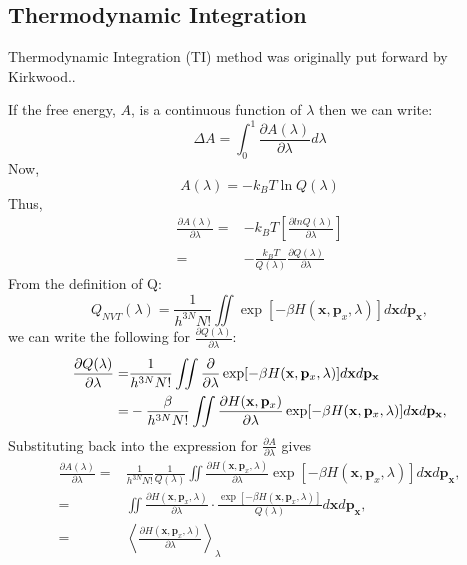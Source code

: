 \subsection{Thermodynamic Integration\label{Sec:FEM:TI}}
Thermodynamic Integration (TI) method was originally put forward by Kirkwood.\cite{KirkwoodJCP1935}. 
	
If the free energy, $A$, is a continuous function of $\lambda$ then we can write:
\begin{equation}
\Delta A = \int_{0}^{1} \frac{\partial{A(\lambda)}}{\partial{\lambda}} d\lambda
\label{Eq:FEM:TI:deltaA1TI}
\end{equation} 
Now,
\begin{equation}
A(\lambda) = -k_{B}T\ln Q(\lambda)
\label{Eq:FEM:TI:Alambda}
\end{equation} 
Thus,
\begin{align}
\frac{\partial{A(\lambda)}}{\partial{\lambda}} =& -k_{B}T \left[ \frac{\partial{lnQ(\lambda)}}{\partial{\lambda}} \right] \\
=&-\frac{k_{B}T}{Q(\lambda)}\frac{\partial{Q(\lambda)}}{\partial{\lambda}}
\label{Eq:FEM:TI:deltaA2TI}
\end{align} 
From the definition of Q:
\begin{equation}
Q_{NVT}(\lambda) = \frac{1}{{h}^{3N}N!} \iint \exp[-\beta H(\mathbf{x},\mathbf{p}_{x},\lambda)] d\mathbf{x}d\mathbf{p}_\mathbf{x},
\label{Eq:FEM:TI:PFTI}
\end{equation}
we can write the following for $\frac{\partial{Q(\lambda)}}{\partial{\lambda}}$:
\begin{align}
\frac{\partial{Q(\lambda)}}{\partial{\lambda}} =&\frac{1}{{h}^{3N}N!} \iint \frac{\partial}{\partial{\lambda}}\exp[-\beta H(\mathbf{x},\mathbf{p}_{x},\lambda)] d\mathbf{x}d\mathbf{p}_\mathbf{x}\notag\\
=& -\frac{\beta}{{h}^{3N}N!} \iint \frac{\partial{H(\mathbf{x},\mathbf{p}_{x})}}{\partial{\lambda}}\exp[-\beta H(\mathbf{x},\mathbf{p}_{x},\lambda)] d\mathbf{x}d\mathbf{p}_\mathbf{x},
\label{Eq:FEM:TI:PPF2}
\end{align}
Substituting back into the expression for $\frac{\partial{A}}{\partial{\lambda}}$ gives
\begin{align}
\frac{\partial{A(\lambda)}}{\partial{\lambda}} =& \frac{1}{{h}^{3N}N!}\frac{1}{Q(\lambda)} \iint \frac{\partial{H(\mathbf{x},\mathbf{p}_{x},\lambda)}}{\partial{\lambda}}\exp[-\beta H(\mathbf{x},\mathbf{p}_{x},\lambda)] d\mathbf{x}d\mathbf{p}_\mathbf{x}, \\
=& \iint \frac{\partial{H(\mathbf{x},\mathbf{p}_{x},\lambda)}}{\partial{\lambda}}\cdot\frac{\exp[-\beta H(\mathbf{x},\mathbf{p}_{x},\lambda)]}{Q(\lambda)} d\mathbf{x}d\mathbf{p}_\mathbf{x}, \\
=& \left \langle \frac{\partial{H(\mathbf{x},\mathbf{p}_{x}, \lambda)}}{\partial{\lambda}} \right \rangle_{\lambda}
\label{Eq:FEM:TI:PA2}
\end{align}
